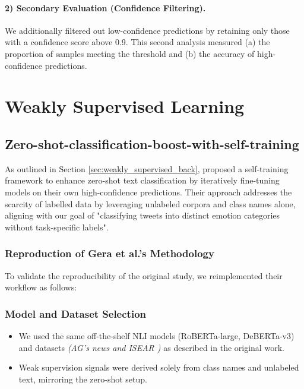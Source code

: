 \paragraph{2) Secondary Evaluation (Confidence Filtering).}
We additionally filtered out low-confidence predictions by retaining only those with a confidence score above 0.9. This second analysis measured (a) the proportion of samples meeting the threshold and (b) the accuracy of high-confidence predictions.


\section{Weakly Supervised Learning}
\subsection{Zero-shot-classification-boost-with-self-training}
As outlined in Section \ref{sec:weakly_supervised_back}, \cite{gera_zero-shot_2022} proposed a self-training framework to enhance zero-shot text classification by iteratively fine-tuning models on their own high-confidence predictions. Their approach addresses the scarcity of labelled data by leveraging unlabeled corpora and class names alone, aligning with our goal of "classifying tweets into distinct emotion categories without task-specific labels". 

\subsubsection*{Reproduction of Gera et al.’s Methodology}
To validate the reproducibility of the original study, we reimplemented their workflow as follows:

\subsubsection*{Model and Dataset Selection}
\begin{itemize}
    \item We used the same off-the-shelf NLI models (RoBERTa-large, DeBERTa-v3) and datasets \textit{(AG’s news \cite{DBLP:journals/corr/ZhangZL15} and ISEAR \cite{Shao2015UniversalityVC})} as described in the original work.
    \item Weak supervision signals were derived solely from class names and unlabeled text, mirroring the zero-shot setup.
\end{itemize}

